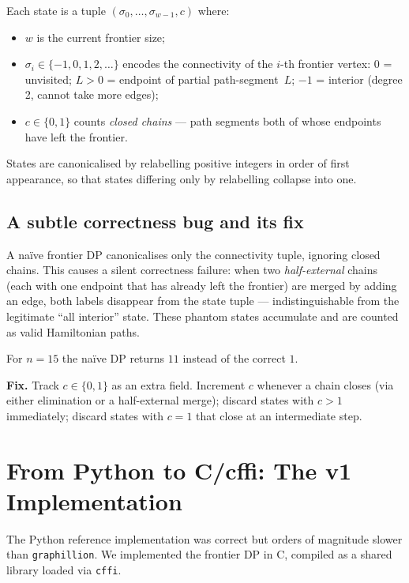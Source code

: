 \documentclass[12pt]{article}
\theoremstyle{definition}
\begin{document}
Each state is a tuple $(\sigma_0,\ldots,\sigma_{w-1}, c)$ where:
\begin{itemize}[nosep]
  \item $w$ is the current frontier size;
  \item $\sigma_i \in \{-1, 0, 1, 2, \ldots\}$ encodes the connectivity of
        the $i$-th frontier vertex: $0$ = unvisited; $L > 0$ = endpoint of
        partial path-segment~$L$; $-1$ = interior (degree 2, cannot take more edges);
  \item $c \in \{0,1\}$ counts \emph{closed chains} — path segments both of
        whose endpoints have left the frontier.
\end{itemize}

States are canonicalised by relabelling positive integers in order of first
appearance, so that states differing only by relabelling collapse into one.

\subsection{A subtle correctness bug and its fix}

A na\"ive frontier DP canonicalises only the connectivity tuple, ignoring
closed chains.
This causes a silent correctness failure: when two \emph{half-external} chains
(each with one endpoint that has already left the frontier) are merged by adding
an edge, both labels disappear from the state tuple — indistinguishable from
the legitimate ``all interior'' state.
These phantom states accumulate and are counted as valid Hamiltonian paths.

For $n = 15$ the na\"ive DP returns $11$ instead of the correct $1$.

\textbf{Fix.} Track $c \in \{0,1\}$ as an extra field.
Increment $c$ whenever a chain closes (via either elimination or a half-external
merge); discard states with $c > 1$ immediately; discard states with $c = 1$
that close at an intermediate step.

\section{From Python to C/cffi: The v1 Implementation}
\label{sec:c}

The Python reference implementation was correct but orders of magnitude slower
than \texttt{graphillion}.
We implemented the frontier DP in C, compiled as a shared library loaded via
\texttt{cffi}.
\end{document}
